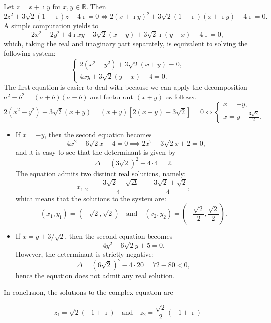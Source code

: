 \documentclass[a4paper,10 pt]{report}
\newcommand{\finalanswer}[1]{%
    \begin{finalAnswer}
    \[
        #1
    \]
    \end{finalAnswer}
}
\theoremstyle{definition}
\newcommand{\R}{\mathbb R}
\begin{document}
\begin{solutionBox} 
	Let $z = x + \imath y$ for $x, y \in \R$. Then
\[
2z^2 + 3 \sqrt{2}(1 - \imath)z - 4 \imath = 0 \iff 2(x + \imath y)^2 + 3 \sqrt{2}(1 - \imath)(x + \imath y) - 4\imath = 0.
\]
A simple computation yields to
\[
2x^2 - 2y^2 + 4\imath xy + 3 \sqrt{2}(x + y) + 3 \sqrt{2} \imath(y - x) - 4\imath = 0,
\]	
which, taking the real and imaginary part separately, is equivalent to solving the following system:
\[
\begin{cases}2(x^2 - y^2) + 3 \sqrt{2}(x + y) = 0, \\ 4xy + 3 \sqrt{2}(y - x) - 4 = 0. \end{cases}
\]
The first equation is easier to deal with because we can apply the decomposition $a^2 - b^2 = (a + b)(a - b)$ and factor out $(x + y)$ as follows:
\begin{equation*}2(x^2 - y^2) + 3 \sqrt{2}(x + y) = (x + y)\left[ 2(x - y) + 3 \sqrt{2} \right] = 0 \iff \begin{cases} x = - y, \\ x = y - \frac{3 \sqrt{2}}{2}.\end{cases} \end{equation*}

\begin{itemize}
	\item If $x=-y$, then the second equation becomes
\begin{equation*}-4x^2 - 6 \sqrt{2}x - 4 = 0 \implies 2x^2 + 3 \sqrt{2}x + 2 = 0, \end{equation*}
and it is easy to see that the determinant is given by
\begin{equation*}\Delta = (3 \sqrt{2})^2 - 4 \cdot 4 = 2. \end{equation*}
The equation admits two distinct real solutions, namely:
\begin{equation*}x_{1, 2} = \frac{- 3 \sqrt{2} \pm \sqrt{\Delta}}{4} = \frac{-3 \sqrt{2} \pm \sqrt{2}}{4}, \end{equation*}
which means that the solutions to the system are:
\begin{equation*} (x_1, y_1) = ( - \sqrt{2}, \sqrt{2} ) \quad \text{and} \quad  (x_2, y_2) = ( - \frac{\sqrt{2}}{2}, \frac{\sqrt{2}}{2} ). \end{equation*}

\item If $x = y + 3/\sqrt 2$, then the second equation becomes
\begin{equation*}4y^2 - 6 \sqrt{2} y + 5 = 0. \end{equation*}
However, the determinant is strictly negative:
\begin{equation*}\Delta = (6 \sqrt{2})^2 - 4 \cdot 20 = 72 - 80 < 0, \end{equation*}
hence the equation does not admit any real solution.
\end{itemize}

In conclusion, the solutions to the complex equation are
\finalanswer{z_1 = \sqrt{2}(-1 + \imath) \quad \text{and} \quad z_2 = \frac{\sqrt{2}}{2} ( - 1 + \imath )}
  \end{solutionBox}
\end{document}
